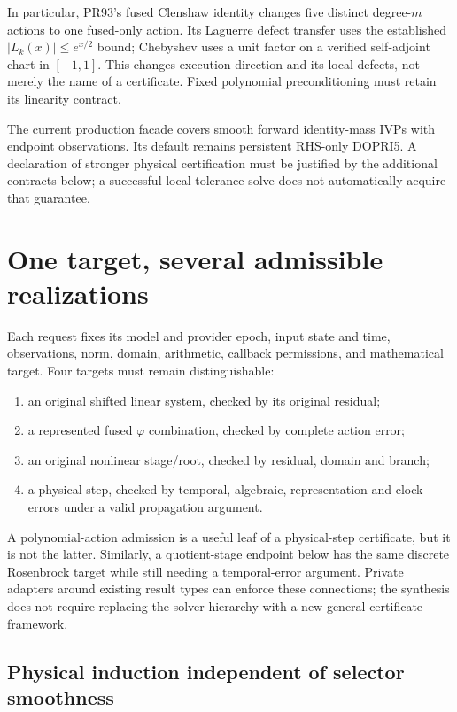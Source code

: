 \documentclass[aps,pra,reprint,onecolumn,10pt,notitlepage,nofootinbib]{revtex4-2}
\begin{document}
In particular, PR93's fused Clenshaw identity changes five distinct degree-$m$
actions to one fused-only action. Its Laguerre defect transfer uses the
established $|L_k(x)|\le e^{x/2}$ bound\cite{dlmf}; Chebyshev uses a unit
factor on a verified self-adjoint chart in $[-1,1]$. This changes execution
direction and its local defects, not merely the name of a certificate.
Fixed polynomial preconditioning must retain its linearity contract\cite{wathen}.

The current production facade covers smooth forward identity-mass IVPs with
endpoint observations. Its default remains persistent RHS-only DOPRI5.
A declaration of stronger physical certification must be justified by the
additional contracts below; a successful local-tolerance solve does not
automatically acquire that guarantee.

\section{One target, several admissible realizations}

Each request fixes its model and provider epoch, input state and time,
observations, norm, domain, arithmetic, callback permissions, and mathematical
target. Four targets must remain distinguishable:
\begin{enumerate}
\item an original shifted linear system, checked by its original residual;
\item a represented fused $\varphi$ combination, checked by complete action error;
\item an original nonlinear stage/root, checked by residual, domain and branch;
\item a physical step, checked by temporal, algebraic, representation and clock
      errors under a valid propagation argument.
\end{enumerate}
A polynomial-action admission is a useful leaf of a physical-step certificate,
but it is not the latter. Similarly, a quotient-stage endpoint below has the
same discrete Rosenbrock target while still needing a temporal-error argument.
Private adapters around existing result types can enforce these connections;
the synthesis does not require replacing the solver hierarchy with a new
general certificate framework.

\subsection{Physical induction independent of selector smoothness}
\end{document}
